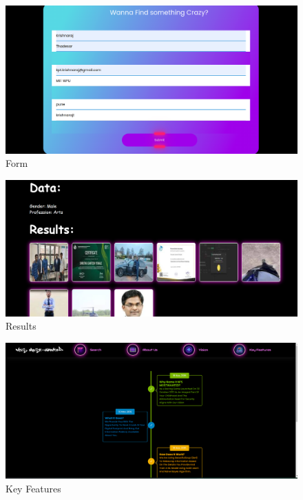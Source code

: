 \documentclass[openany]{report}
\begin{document}
\begin{figure}[H]
    \centering
    \includegraphics[width=.95\textwidth]{../screenshots/form.png}
    \caption{Form}
    \label{fig:form}
\end{figure}

\begin{figure}[H]
    \centering
    \includegraphics[width=.95\textwidth]{../screenshots/searchresult.png}
    \caption{Results}
    \label{fig:Results}
\end{figure}

\begin{figure}[H]
    \centering
    \includegraphics[width=.95\textwidth]{../screenshots/keyfeatures.png}
    \caption{Key Features}
    \label{fig:key features}
\end{figure}
\end{document}
